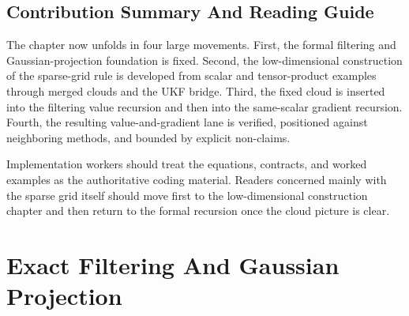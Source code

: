 \documentclass[11pt]{article}
\numberwithin{equation}{section}
\begin{document}
\subsection{Contribution Summary And Reading Guide}
\label{sec:p31-computes}

The chapter now unfolds in four large movements.  First, the formal filtering and
Gaussian-projection foundation is fixed.  Second, the low-dimensional
construction of the sparse-grid rule is developed from scalar and tensor-product
examples through merged clouds and the UKF bridge.  Third, the fixed cloud is
inserted into the filtering value recursion and then into the same-scalar
gradient recursion.  Fourth, the resulting value-and-gradient lane is verified,
positioned against neighboring methods, and bounded by explicit non-claims.

Implementation workers should treat the equations, contracts, and worked examples
as the authoritative coding material.  Readers concerned mainly with the sparse
grid itself should move first to the low-dimensional construction chapter and
then return to the formal recursion once the cloud picture is clear.

\section{Exact Filtering And Gaussian Projection}
\label{sec:p31-ssm}
\end{document}
